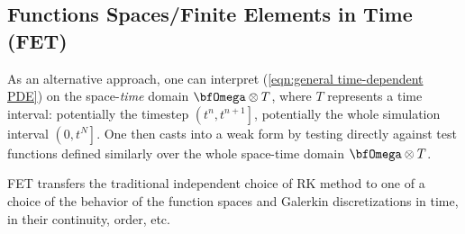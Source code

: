 \subsection{Functions Spaces/Finite Elements in Time (FET)}\label{cha:FET}
    As an alternative approach, one can interpret (\ref{eqn:general time-dependent PDE}) on the space-\emph{time} domain $\bfOmega\otimes T$, where $T$ represents a time interval: potentially the timestep $\left(t^{n}, t^{n + 1}\right]$, potentially the whole simulation interval $\left(0, t^{N}\right]$. One then casts into a weak form by testing directly against test functions defined similarly over the whole space-time domain $\bfOmega\otimes T$.
    
    FET transfers the traditional independent choice of RK method to one of a choice of the behavior of the function spaces and Galerkin discretizations in time, in their continuity, order, etc.
    

